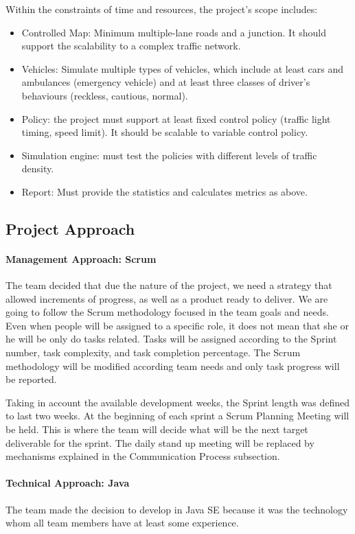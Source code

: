 \documentclass[11pt]{article}
\begin{document}
Within the constraints of time and resources, the project’s scope includes:
\begin{itemize}
\item Controlled Map: Minimum multiple-lane roads and a junction. It should support the scalability to a complex traffic network.
\item Vehicles: Simulate multiple types of vehicles, which include at least cars and ambulances (emergency vehicle) and at least three classes of driver’s behaviours (reckless, cautious, normal).
\item Policy: the project must support at least fixed control policy (traffic light timing, speed limit). It should be scalable to variable control policy.
\item Simulation engine: must test the policies with different levels of traffic density.
\item Report: Must provide the statistics and calculates metrics as above.
\end{itemize}


\subsection{Project Approach}
	\paragraph{Management Approach: Scrum} The team decided that due the nature of the project, we need a strategy that allowed increments of progress, as well as a product ready to deliver. We are going to follow the Scrum methodology focused in the team goals and needs. Even when people will be assigned to a specific role, it does not mean that she or he will be only do tasks related. Tasks will be assigned according to the Sprint number, task complexity, and task completion percentage. The Scrum methodology will be modified according team needs and only task progress will be reported.
	
	Taking in account the available development weeks, the Sprint length was defined to last two weeks. At the beginning of each sprint a Scrum Planning Meeting will be held. This is where the team will decide what will be the next target deliverable for the sprint. The daily stand up meeting will be replaced by mechanisms explained in the Communication Process subsection.

	
	\paragraph{Technical Approach: Java} The team made the decision to develop in Java SE because it was the technology whom all team members have at least some experience. 
	
\end{document}
